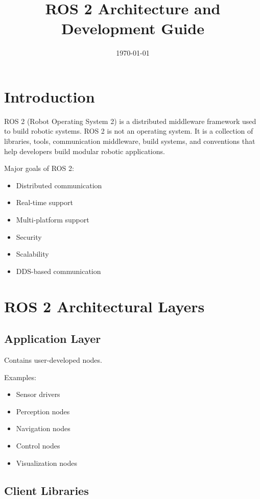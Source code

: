 \documentclass[11pt]{article}
\title{ROS 2 Architecture and Development Guide}
\author{}
\date{\today}
\begin{document}
\maketitle
\tableofcontents
\newpage

\section{Introduction}

ROS 2 (Robot Operating System 2) is a distributed middleware framework used to build robotic systems.
ROS 2 is not an operating system. It is a collection of libraries, tools, communication middleware,
build systems, and conventions that help developers build modular robotic applications.

Major goals of ROS 2:

\begin{itemize}
\item Distributed communication
\item Real-time support
\item Multi-platform support
\item Security
\item Scalability
\item DDS-based communication
\end{itemize}

\section{ROS 2 Architectural Layers}

\subsection{Application Layer}

Contains user-developed nodes.

Examples:

\begin{itemize}
\item Sensor drivers
\item Perception nodes
\item Navigation nodes
\item Control nodes
\item Visualization nodes
\end{itemize}

\subsection{Client Libraries}
\end{document}
